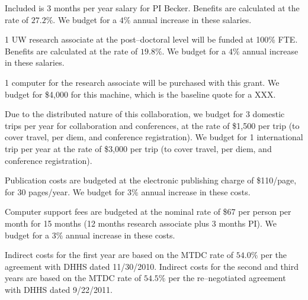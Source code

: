 \bigskip {} Included is 3 months per year salary for PI
Becker. Benefits are calculated at the rate of $27.2\%$.  We budget for a $4\%$
annual increase in these salaries.

\bigskip {} 1 UW research associate at the
post--doctoral level will be funded at 100\% FTE.  Benefits are calculated at
the rate of $19.8\%$.  We budget for a $4\%$ annual increase in these salaries.

\bigskip {} 1 computer for the research associate will be
purchased with this grant. We budget for \$4,000 for this machine, which is the
baseline quote for a XXX.

\bigskip {} Due to the distributed nature of this
collaboration, we budget for 3 domestic trips per year for collaboration and
conferences, at the rate of \$1,500 per trip (to cover travel, per diem, and
conference registration).  We budget for 1 international trip per year at the
rate of \$3,000 per trip (to cover travel, per diem, and conference
registration).

\bigskip {} Publication costs are budgeted at
the electronic publishing charge of \$110/page, for 30 pages/year.  We budget
for $3\%$ annual increase in these costs.

\bigskip {} Computer support fees are budgeted at
the nominal rate of \$67 per person per month for 15 months (12 months research
associate plus 3 months PI).  We budget for a $3\%$ annual increase in these
costs.

\bigskip {} Indirect costs for the first year are based on
the MTDC rate of $54.0\%$ per the agreement with DHHS dated 11/30/2010. 
Indirect costs for the second and third years are based on the MTDC rate of
$54.5\%$ per the re--negotiated agreement with DHHS dated 9/22/2011.
